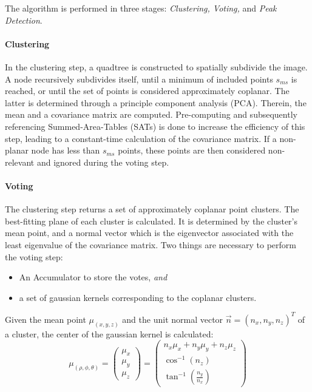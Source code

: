 \documentclass[main.tex]{subfiles}
\begin{document}
The algorithm is performed in three stages: \textit{Clustering, Voting,} and \textit{Peak Detection}.

\paragraph{Clustering}
In the clustering step, a quadtree is constructed to spatially subdivide the image. A node recursively subdivides
itself, until a minimum of included points $s_{ms}$ is reached, or until the set of points is considered approximately
coplanar. The latter is determined through a principle component analysis (PCA). Therein, the mean and
a covariance matrix are computed.
Pre-computing and subsequently referencing Summed-Area-Tables (SATs) is done to increase the efficiency
of this step, leading to a constant-time calculation of the covariance matrix.
If a non-planar node has less than $s_{ms}$ points, these points are then considered non-relevant and
ignored during the voting step.

\paragraph{Voting}
The clustering step returns a set of approximately coplanar point clusters.
The best-fitting plane of each cluster is calculated. It is determined by the cluster's mean point,
and a normal vector which is the eigenvector associated with the least eigenvalue of the covariance matrix.
Two things are necessary to perform the voting step:
\begin{itemize}
    \item An Accumulator to store the votes, \textit{and}
    \item a set of gaussian kernels corresponding to the coplanar clusters.
\end{itemize}
Given the mean point $\mu_{(x,y,z)}$ and the unit normal vector $\overrightarrow{n}=(n_x,n_y,n_z)^T$ of a cluster,
the center of the gaussian kernel is calculated:
\def\A{
    \begin{pmatrix}
        \mu_x \\
        \mu_y \\
        \mu_z
    \end{pmatrix}
}
\def\B{
    \begin{matrix}
        n_x\mu_x + n_y\mu_y + n_z\mu_z \\
        \cos^{-1}(n_z)                 \\
        \tan^{-1}(\frac{n_y}{n_x})
    \end{matrix}
}
\begin{equation}
    \label{eq:kht-kernel}
    \mu_{(\rho,\phi,\theta)} = \A =  \left(\B\right)
\end{equation}
\end{document}
